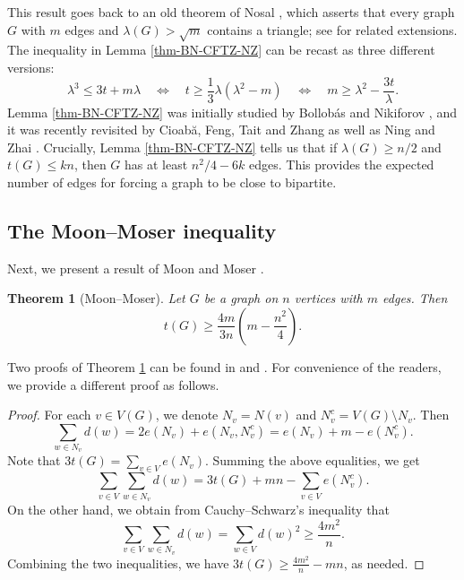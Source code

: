\documentclass[11pt]{article}
\newtheorem{theorem}{Theorem}[section]
\begin{document}
This result goes back to an old theorem of Nosal \cite{Nosal1970}, which asserts that every graph $G$ with $m$ edges and $\lambda (G)> \sqrt{m}$ contains a triangle; see \cite{Niki2002cpc,Ning2017-ars} for related extensions.  
The inequality in Lemma \ref{thm-BN-CFTZ-NZ} can be recast as three different versions: 
\begin{equation*} 
   \lambda^3 \le 3t + m \lambda 
\quad \Leftrightarrow \quad {t\ge \frac{1}{3}\lambda (\lambda^2 - m)  } 
\quad \Leftrightarrow \quad m \ge \lambda^2- \frac{3t}{\lambda}. 
\end{equation*}
Lemma \ref{thm-BN-CFTZ-NZ} was initially studied by 
Bollob\'{a}s and Nikiforov  \cite{BN2007jctb}, 
and it was recently revisited by Cioab\u{a},  Feng, 
Tait and Zhang \cite{CFTZ20} as well as Ning and Zhai \cite{NZ2021}. 
Crucially, Lemma \ref{thm-BN-CFTZ-NZ}  tells us that if 
 $\lambda (G)\ge {n}/{2}$ and $t(G)\le kn$, then $G$ has at least $n^2/4 - 6k$ edges. 
This provides the expected number of edges  
 for forcing a graph to be close to bipartite.   




\subsection{The Moon--Moser inequality}

Next, we present a result of Moon and Moser \cite[p. 285]{MM1962}.  

\begin{theorem}[Moon--Moser] 
\label{thm-MM-k3}
Let $G$ be a graph on $n$ vertices with $m$ edges. 
Then  
\[ t(G) \ge \frac{4m}{3n}\left(m- \frac{n^2}{4} \right). \]
\end{theorem}

Two proofs of Theorem \ref{thm-MM-k3} 
can be found in \cite[p. 297]{Bollobas78} and \cite[p. 443]{Lov1979}. 
For convenience of the readers, we provide a different proof as follows. 
 
\begin{proof}  
For each $v\in V(G)$, we denote $N_v= N(v)$ and $N_v^c = V(G) \setminus N_v$. Then 
\[ \sum_{w\in N_v} d(w) = 2e(N_v) + e(N_v, N_v^c) = 
e(N_v) + m - e(N_v^c). \]    
Note that  $3t(G) =\sum_{v\in V}e(N_v)$.  
Summing the  above equalities, we get 
\[    \sum_{v\in V} \sum_{w\in N_v} d(w)  =
 3t(G) + mn  - 
\sum_{v\in V} e(N_v^c). \]
On the other hand, 
we obtain from Cauchy--Schwarz's inequality that  
\[   \sum_{v\in V} \sum_{w\in N_v} d(w)  
= \sum_{w\in V} d(w)^2 \ge \frac{4m^2}{n}.  \] 
Combining the two inequalities, 
we have 
$ 3t(G) \ge \frac{4m^2}{n} - mn $, as needed. 
\end{proof}
\end{document}
